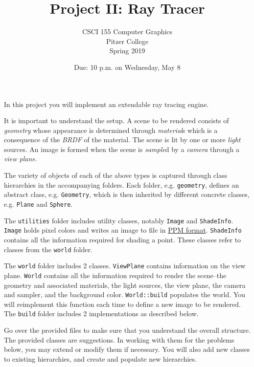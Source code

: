 \documentclass[addpoints]{exam}
\title{Project II: Ray Tracer}
\author{CSCI 155 Computer Graphics\\Pitzer College\\Spring 2019}
\date{Due: 10 p.m. on Wednesday, May 8}
\begin{document}
\maketitle
\thispagestyle{empty}

In this project you will implement an extendable ray tracing engine.

It is important to understand the setup. A scene to be rendered consists of \emph{geometry} whose appearance is determined through \emph{material}s which is a consequence of the \emph{BRDF} of the material. The scene is lit by one or more \emph{light} sources. An image is formed when the scene is \emph{sample}d by a \emph{camera} through a \emph{view plane}.

The variety of objects of each of the above types is captured through class hierarchies in the accompanying folders. Each folder, e.g. \texttt{geometry}, defines an abstract class, e.g. \texttt{Geometry}, which is then inherited by different concrete classes, e.g. \texttt{Plane} and \texttt{Sphere}.

The \texttt{utilities} folder includes utility classes, notably \texttt{Image} and \texttt{ShadeInfo}. \texttt{Image} holds pixel colors and writes an image to file in \href{https://en.wikipedia.org/wiki/Netpbm_format#PBM_example}{PPM format}. \texttt{ShadeInfo} contains all the information required for shading a point. These classes refer to classes from the \texttt{world} folder.

The \texttt{world} folder includes 2 classes. \texttt{ViewPlane} contains information on the view plane. \texttt{World} contains all the information required to render the scene--the geometry and associated materials, the light sources, the view plane, the camera and sampler, and the background color. \texttt{World::build} populates the world. You will reimplement this function each time to define a new image to be rendered. The \texttt{build} folder includes 2 implementations as described below.

  Go over the provided files to make sure that you understand the overall structure. The provided classes are suggestions. In working with them for the problems below, you may extend or modify them if necessary. You will also add new classes to existing hierarchies, and create and populate new hierarchies.
\end{document}
